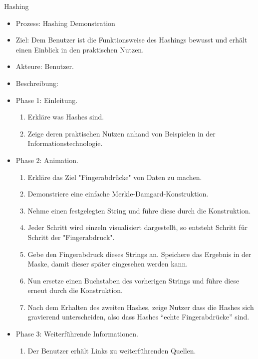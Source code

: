 \documentclass{article}
\begin{document}
\begin{FA}[start=600]
\item Hashing
\end{FA}
\begin{itemize}[label={}]
\item Prozess: Hashing Demonstration
\item Ziel: Dem Benutzer ist die Funktionsweise des Hashings bewusst und erhält einen Einblick in den praktischen Nutzen.
\item Akteure: Benutzer.
\item Beschreibung:
\item Phase 1: Einleitung.
\begin{enumerate}
\item Erkläre was Hashes sind.
\item Zeige deren praktischen Nutzen anhand von Beispielen in der Informationstechnologie.
\end{enumerate}
\item Phase 2: Animation.
\begin{enumerate}
\item Erkläre das Ziel "Fingerabdrücke" von Daten zu machen.
\item Demonstriere eine einfache Merkle-Damgard-Konstruktion.
\item Nehme einen festgelegten String und führe diese durch die Konstruktion.
\item Jeder Schritt wird einzeln visualisiert dargestellt, so entsteht Schritt für Schritt der "Fingerabdruck".
\item Gebe den Fingerabdruck dieses Strings an. Speichere das Ergebnis in der Maske, damit dieser später eingesehen werden kann.
\item Nun ersetze einen Buchstaben des vorherigen Strings und führe diese erneut durch die Konstruktion.
\item Nach dem Erhalten des zweiten Hashes, zeige Nutzer dass die Hashes sich gravierend unterscheiden, also dass Hashes ``echte Fingerabdrücke'' sind.
\end{enumerate}
\item Phase 3: Weiterführende Informationen.
\begin{enumerate}
\item Der Benutzer erhält Links zu weiterführenden Quellen.
\end{enumerate}
\end{itemize}
\end{document}
